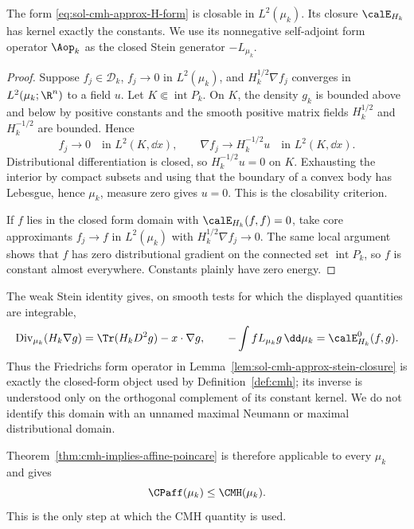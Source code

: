 \documentclass[../main.tex]{subfiles}
\begin{document}
\begin{lemma}
\label{lem:sol-cmh-approx-stein-closure}
The form \eqref{eq:sol-cmh-approx-H-form} is closable in $L^2(\mu_k)$.  Its closure
$\calE_{H_k}$ has kernel exactly the constants.  We use its nonnegative self-adjoint form
operator $\Aop_k$ as the closed Stein generator $-L_{\mu_k}$.
\end{lemma}

\begin{proof}
Suppose $f_j\in\mathscr D_k$, $f_j\to0$ in $L^2(\mu_k)$, and
$H_k^{1/2}\nabla f_j$ converges in $L^2(\mu_k;\R^n)$ to a field $u$.  Let
$K\Subset\operatorname{int}P_k$.  On $K$, the density $g_k$ is bounded above and below by
positive constants and the smooth positive matrix fields $H_k^{1/2}$ and $H_k^{-1/2}$ are
bounded.  Hence
\[
  f_j\longrightarrow0\quad\text{in }L^2(K,\dd x),
  \qquad
  \nabla f_j\longrightarrow H_k^{-1/2}u
     \quad\text{in }L^2(K,\dd x).
\]
Distributional differentiation is closed, so $H_k^{-1/2}u=0$ on $K$.  Exhausting the interior
by compact subsets and using that the boundary of a convex body has Lebesgue, hence
$\mu_k$, measure zero gives $u=0$.  This is the closability criterion.

If $f$ lies in the closed form domain with $\calE_{H_k}(f,f)=0$, take core approximants
$f_j\to f$ in $L^2(\mu_k)$ with $H_k^{1/2}\nabla f_j\to0$.  The same local argument shows
that $f$ has zero distributional gradient on the connected set
$\operatorname{int}P_k$, so $f$ is constant almost everywhere.  Constants plainly have zero
energy.
\end{proof}

The weak Stein identity gives, on smooth tests for which the displayed quantities are
integrable,
\[
  \operatorname{Div}_{\mu_k}(H_k\nabla g)
  =\Tr(H_kD^2g)-x\cdot\nabla g,
  \qquad
  -\int fL_{\mu_k}g\,\dd\mu_k=\calE_{H_k}^0(f,g).
\]
Thus the Friedrichs form operator in Lemma~\ref{lem:sol-cmh-approx-stein-closure} is exactly the
closed-form object used by Definition~\ref{def:cmh}; its inverse is understood only on the
orthogonal complement of its constant kernel.  We do not identify this domain with an unnamed
maximal Neumann or maximal distributional domain.

Theorem~\ref{thm:cmh-implies-affine-poincare} is therefore applicable to every $\mu_k$ and gives
\begin{equation}
  \CPaff(\mu_k)\le\CMH(\mu_k).
  \label{eq:sol-cmh-approx-regular-endpoint}
\end{equation}
This is the only step at which the CMH quantity is used.
\end{document}
